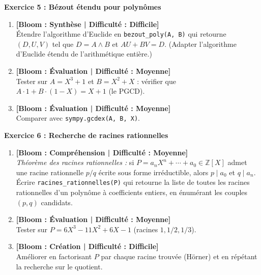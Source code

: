 \documentclass[12pt,a4paper]{report}
\theoremstyle{definition}
\theoremstyle{remark}
\begin{document}
\vspace{0.3cm}

\noindent\textbf{Exercice 5 : Bézout étendu pour polynômes}
\begin{enumerate}
    \item \textbf{[Bloom : Synthèse | Difficulté : Difficile]} \\
    Étendre l'algorithme d'Euclide en \texttt{bezout\_poly(A, B)} qui retourne $(D, U, V)$ tel que $D = A \wedge B$ et $A U + B V = D$. (Adapter l'algorithme d'Euclide étendu de l'arithmétique entière.)
    \item \textbf{[Bloom : Évaluation | Difficulté : Moyenne]} \\
    Tester sur $A = X^3 + 1$ et $B = X^2 + X$ : vérifier que $A \cdot 1 + B \cdot (1 - X) = X + 1$ (le PGCD).
    \item \textbf{[Bloom : Évaluation | Difficulté : Moyenne]} \\
    Comparer avec \texttt{sympy.gcdex(A, B, X)}.
\end{enumerate}

\vspace{0.3cm}

\noindent\textbf{Exercice 6 : Recherche de racines rationnelles}
\begin{enumerate}
    \item \textbf{[Bloom : Compréhension | Difficulté : Moyenne]} \\
    \emph{Théorème des racines rationnelles :} si $P = a_n X^n + \cdots + a_0 \in \mathbb{Z}[X]$ admet une racine rationnelle $p/q$ écrite sous forme irréductible, alors $p \mid a_0$ et $q \mid a_n$.
    Écrire \texttt{racines\_rationnelles(P)} qui retourne la liste de toutes les racines rationnelles d'un polynôme à coefficients entiers, en énumérant les couples $(p, q)$ candidats.
    \item \textbf{[Bloom : Évaluation | Difficulté : Moyenne]} \\
    Tester sur $P = 6X^3 - 11X^2 + 6X - 1$ (racines $1, 1/2, 1/3$).
    \item \textbf{[Bloom : Création | Difficulté : Difficile]} \\
    Améliorer en factorisant $P$ par chaque racine trouvée (Hörner) et en répétant la recherche sur le quotient.
\end{enumerate}

\vspace{0.3cm}
\end{document}
